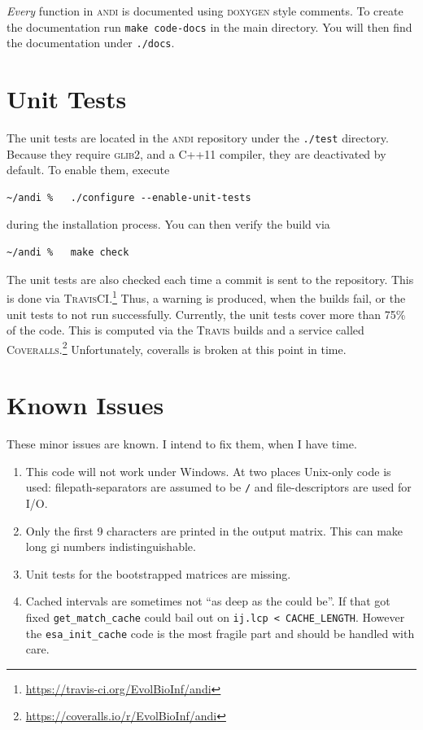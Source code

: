 \documentclass[a4paper,
  10pt,
  english,
  DIV=12,
  BCOR=8mm]{scrbook}
\newcommand{\algo}[1]{\textsc{{#1}}}
\newcommand{\andi}{\algo{andi}\xspace}
\begin{document}
\emph{Every} function in \andi is documented using \algo{doxygen} style comments. To create the documentation run \lstinline$make code-docs$ in the main directory. You will then find the documentation under \lstinline$./docs$.


\section{Unit Tests}

The unit tests are located in the \andi repository under the \lstinline$./test$ directory. Because they require \algo{glib2}, and a C++11 compiler, they are deactivated by default. To enable them, execute

\begin{lstlisting}
~/andi %   ./configure --enable-unit-tests
\end{lstlisting}

\noindent during the installation process. You can then verify the build via 

\begin{lstlisting}
~/andi %   make check
\end{lstlisting}

\noindent The unit tests are also checked each time a commit is sent to the repository. This is done via \algo{TravisCI}.\footnote{\url{https://travis-ci.org/EvolBioInf/andi}} Thus, a warning is produced, when the builds fail, or the unit tests to not run successfully. Currently, the unit tests cover more than 75\% of the code. This is computed via the \algo{Travis} builds and a service called \algo{Coveralls}.\footnote{\url{https://coveralls.io/r/EvolBioInf/andi}} Unfortunately, coveralls is broken at this point in time.

\section{Known Issues}

These minor issues are known. I intend to fix them, when I have time.

\begin{enumerate}
  \item This code will not work under Windows. At two places Unix-only code is used: filepath-separators are assumed to be \lstinline$/$ and file-descriptors are used for I/O.
  \item Only the first 9 characters are printed in the output matrix. This can make long gi numbers indistinguishable.
  \item Unit tests for the bootstrapped matrices are missing.
  \item Cached intervals are sometimes not “as deep as the could be”. If that got fixed \lstinline$get_match_cache$ could bail out on \lstinline$ij.lcp < CACHE_LENGTH$. However the \lstinline$esa_init_cache$ code is the most fragile part and should be handled with care.
\end{enumerate}
\end{document}
